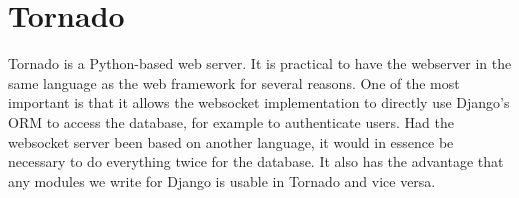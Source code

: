 \section{Tornado}
Tornado\cite{tornadoweb11} is a Python-based web server. It is practical to have the webserver in the same language as the web framework for several reasons. One of the most important is that it allows the websocket implementation to directly use Django's ORM to access the database, for example to authenticate users. Had the websocket server been based on another language, it would in essence be necessary to do everything twice for the database. It also has the advantage that any modules we write for Django is usable in Tornado and vice versa.